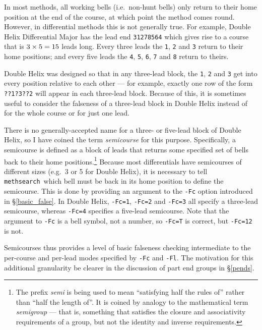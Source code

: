 \documentclass[a4paper,11pt,oneside]{book}
\makeatletter
\newcommand{\oidx}[2]{\index{#1@{\hspace*{-\optwidth}\texttt{-}#2}|ulink}}
\def\methsearch{\texttt{meth\-search}}
\newcommand{\sref}[1]{\hyperref[#1]{\S\ref{#1}}}
\makeatother
\begin{document}
In most methods, all working bells (i.e.\ non-hunt bells) only return to their
home position at the end of the course, at which point the method comes round.
However, in differential methods this is not generally 
true.  For example, 
Double Helix Differential Major 
has the lead end \verb+31278564+ which gives rise to a course that is
$\hbox{3}\times\hbox{5} = \hbox{15}$ leads long.  Every three leads the
\verb+1+, \verb+2+ and \verb+3+ return to their home positions; and every
five leads the \verb+4+, \verb+5+, \verb+6+, \verb+7+ and \verb+8+ return
to theirs.

Double Helix was designed so that in any three-lead block, 
the \verb+1+, \verb+2+ and \verb+3+ get into every position relative to each 
other --- for example, exactly one row of the form \verb+??1?3??2+ will 
appear in each three-lead block.  Because of this, it is sometimes useful
to consider the falseness of a three-lead block in Double Helix instead of
for the whole course or for just one lead.

There is no generally-accepted name for a three- or five-lead block of 
Double Helix, so I have coined the term \textit{semicourse} for this purpose.
Specifically, a semicourse is defined as a block of leads that returns some 
specified set of bells back to their home positions.\footnote{%
The prefix \textit{semi} is being used to mean ``satisfying
half the rules of'' rather than ``half the length of''.  
It is coined by analogy to the mathematical term \textit{semigroup} --- 
that is, something that satisfies the closure and associativity requirements 
of a group, but not the identity and inverse requirements.}
Because most differentials have semicourses of different sizes (e.g.\ 3 or
5 for Double Helix), it is necessary to tell \methsearch\ which bell must be
back in its home position to define the semicourse.  This is done by
providing an argument to the \verb+-Fc+ option\oidx{Fc}{\texttt{Fc}} 
introduced in \sref{basic_false}.  
In Double Helix, \verb+-Fc=1+, \verb+-Fc=2+ and 
\verb+-Fc=3+ all specify a three-lead semicourse, whereas \verb+-Fc=4+ 
specifies a five-lead semicourse.  Note that the argument to \verb+-Fc+ 
is a bell symbol, not a number, so \verb+-Fc=T+ is correct, but \verb+-Fc=12+
is not.

Semicourses thus provides a level of basic falseness checking intermediate 
to the per-course and per-lead modes specified by \verb+-Fc+ and \verb+-Fl+.
The motivation for this additional granularity be clearer in the discussion of 
part end groups in \sref{pends}.
\end{document}
